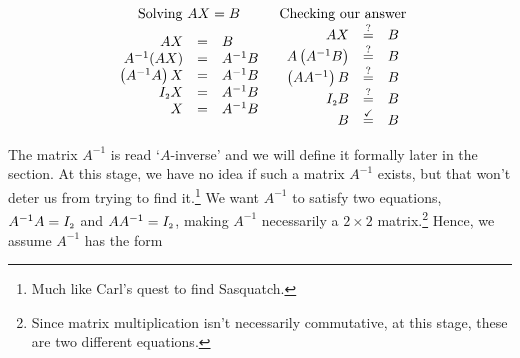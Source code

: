 \[ \begin{array}{cc}  

\text{Solving $AX = B$} & \text{Checking our answer} \\

\begin{array}{rcl}

AX & = & B \\

A^{-1}(AX) & = & A^{-1}B \\

\left(A^{-1}A\right) X & = & A^{-1}B \\

I_{\mbox{\tiny$2$}}X & = & A^{-1}B \\

X & = & A^{-1}B \\

\end{array} 

&

\begin{array}{rcl}

AX & \stackrel{?}{=} & B \\

A \left(A^{-1}B\right) & \stackrel{?}{=} & B \\

\left(AA^{-1}\right) B & \stackrel{?}{=}& B \\

I_{\mbox{\tiny$2$}}B & \stackrel{?}{=} & B \\

B & \stackrel{\checkmark}{=}& B \\

\end{array} \\

\end{array}\]

 \label{solvingmatrixeqn}

The matrix $A^{-1}$ is read `$A$-inverse' and we will define it formally later in the section. At this stage, we have no idea if such a matrix $A^{-1}$ exists, but that won't deter us from trying to find it.\footnote{Much like Carl's quest to find Sasquatch.} We want $A^{-1}$ to satisfy two equations, $A^{-1}A = I_{\mbox{\tiny$2$}}$ and $AA^{-1} = I_{\mbox{\tiny$2$}}$, making $A^{-1}$ necessarily a $2 \times 2$ matrix.\footnote{Since matrix multiplication isn't necessarily commutative, at this stage, these are two different equations.}  Hence, we assume $A^{-1}$ has the form 

